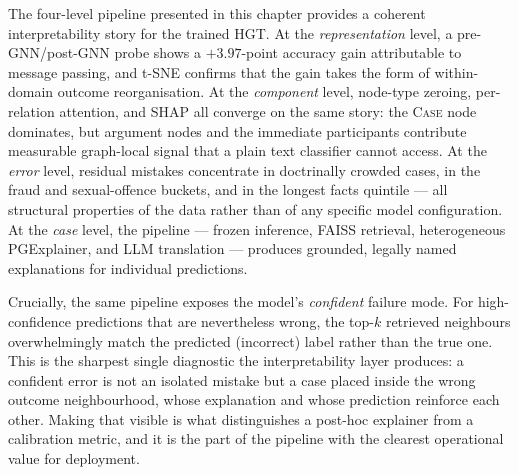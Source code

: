 The four-level pipeline presented in this chapter provides a
coherent interpretability story for the trained HGT.  At the
\emph{representation} level, a pre-GNN/post-GNN probe shows a
$+3.97$-point accuracy gain attributable to message passing, and
t-SNE confirms that the gain takes the form of within-domain outcome
reorganisation.  At the \emph{component} level, node-type zeroing,
per-relation attention, and SHAP all converge on the same story: the
\textsc{Case} node dominates, but argument nodes and the immediate
participants contribute measurable graph-local signal that a plain
text classifier cannot access.  At the \emph{error} level, residual
mistakes concentrate in doctrinally crowded cases, in the fraud and
sexual-offence buckets, and in the longest facts quintile --- all
structural properties of the data rather than of any specific model
configuration.  At the \emph{case} level, the 
pipeline --- frozen inference, FAISS retrieval, heterogeneous
PGExplainer, and LLM translation --- produces grounded, legally
named explanations for individual predictions.

Crucially, the same pipeline exposes the model's \emph{confident}
failure mode.  For high-confidence predictions that are nevertheless
wrong, the top-$k$ retrieved neighbours overwhelmingly match the
predicted (incorrect) label rather than the true one.  This is the
sharpest single diagnostic the interpretability layer produces: a
confident error is not an isolated mistake but a case placed inside
the wrong outcome neighbourhood, whose explanation and whose
prediction reinforce each other.  Making that visible is what
distinguishes a post-hoc explainer from a calibration metric, and it
is the part of the pipeline with the clearest operational value for
deployment.
